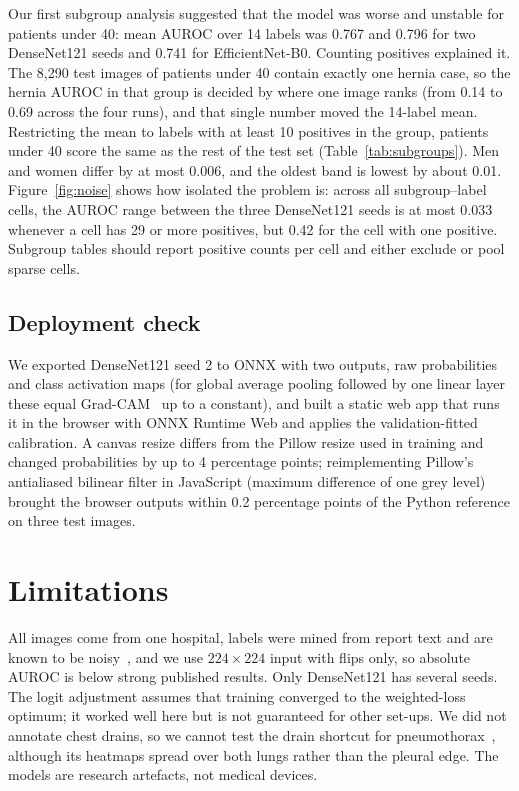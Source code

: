 \documentclass[11pt]{article}
\begin{document}
Our first subgroup analysis suggested that the model was worse and unstable for patients under 40: mean AUROC over 14 labels was 0.767 and 0.796 for two DenseNet121 seeds and 0.741 for EfficientNet-B0. Counting positives explained it. The 8,290 test images of patients under 40 contain exactly one hernia case, so the hernia AUROC in that group is decided by where one image ranks (from 0.14 to 0.69 across the four runs), and that single number moved the 14-label mean. Restricting the mean to labels with at least 10 positives in the group, patients under 40 score the same as the rest of the test set (Table~\ref{tab:subgroups}). Men and women differ by at most 0.006, and the oldest band is lowest by about 0.01. Figure~\ref{fig:noise} shows how isolated the problem is: across all subgroup--label cells, the AUROC range between the three DenseNet121 seeds is at most 0.033 whenever a cell has 29 or more positives, but 0.42 for the cell with one positive. Subgroup tables should report positive counts per cell and either exclude or pool sparse cells.

\subsection{Deployment check}

We exported DenseNet121 seed 2 to ONNX with two outputs, raw probabilities and class activation maps (for global average pooling followed by one linear layer these equal Grad-CAM~\cite{selvaraju2017gradcam} up to a constant), and built a static web app that runs it in the browser with ONNX Runtime Web and applies the validation-fitted calibration. A canvas resize differs from the Pillow resize used in training and changed probabilities by up to 4 percentage points; reimplementing Pillow's antialiased bilinear filter in JavaScript (maximum difference of one grey level) brought the browser outputs within 0.2 percentage points of the Python reference on three test images.

\section{Limitations}

All images come from one hospital, labels were mined from report text and are known to be noisy~\cite{oakdenrayner2020exploring}, and we use $224\times224$ input with flips only, so absolute AUROC is below strong published results. Only DenseNet121 has several seeds. The logit adjustment assumes that training converged to the weighted-loss optimum; it worked well here but is not guaranteed for other set-ups. We did not annotate chest drains, so we cannot test the drain shortcut for pneumothorax~\cite{oakdenrayner2020hidden}, although its heatmaps spread over both lungs rather than the pleural edge. The models are research artefacts, not medical devices.
\end{document}
